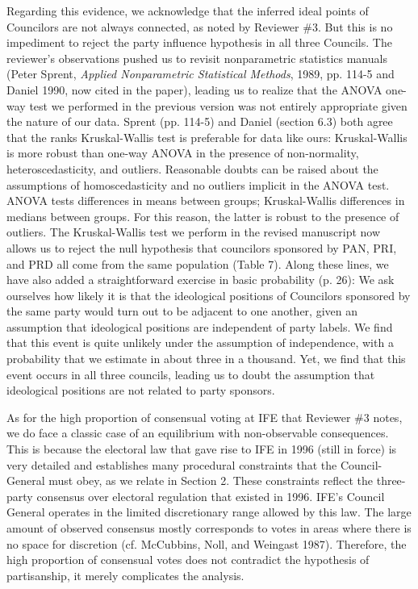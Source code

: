 \documentclass[12pt]{article}
\begin{document}
Regarding this evidence, we acknowledge that the inferred ideal
points of Councilors are not always connected, as noted by Reviewer
\#3. But this is no impediment to reject the party influence
hypothesis in all three Councils. The reviewer's observations pushed
us to revisit nonparametric statistics manuals (Peter Sprent,
\emph{Applied Nonparametric Statistical Methods}, 1989, pp. 114-5
and Daniel 1990, now cited in the paper), leading us to realize that
the ANOVA one-way test we performed in the previous version was not
entirely appropriate given the nature of our data. Sprent (pp.
114-5) and Daniel (section 6.3) both agree that the ranks
Kruskal-Wallis test is preferable for data like ours: Kruskal-Wallis
is more robust than one-way ANOVA in the presence of non-normality,
heteroscedasticity, and outliers. Reasonable doubts can be raised
about the assumptions of homoscedasticity and no outliers implicit
in the ANOVA test.   ANOVA tests differences in means between
groups; Kruskal-Wallis differences in medians between groups. For
this reason, the latter is robust to the presence of outliers. The
Kruskal-Wallis test we perform in the revised manuscript now allows
us to reject the null hypothesis that councilors sponsored by PAN,
PRI, and PRD all come from the same population (Table 7).  Along
these lines, we have also added a straightforward exercise in basic
probability (p. 26):  We ask ourselves how likely it is that the
ideological positions of Councilors sponsored by the same party
would turn out to be adjacent to one another, given an assumption
that ideological positions are independent of party labels.   We
find that this event is quite unlikely under the assumption of
independence, with a probability that we estimate in about three in
a thousand.  Yet, we find that this event occurs in all three
councils, leading us to doubt the assumption that ideological
positions are not related to party sponsors.

As for the high proportion of consensual voting at IFE that Reviewer
\#3 notes, we do face a classic case of an equilibrium with
non-observable consequences.  This is because the electoral law that
gave rise to IFE in 1996 (still in force) is very detailed and
establishes many procedural constraints that the Council-General
must obey, as we relate in Section 2.  These constraints reflect the
three-party consensus over electoral regulation that existed in
1996.  IFE's Council General operates in the limited discretionary
range allowed by this law. The large amount of observed consensus
mostly corresponds to votes in areas where there is no space for
discretion (cf. McCubbins, Noll, and Weingast 1987).  Therefore, the
high proportion of consensual votes does not contradict the
hypothesis of partisanship, it merely complicates the analysis.
\end{document}
